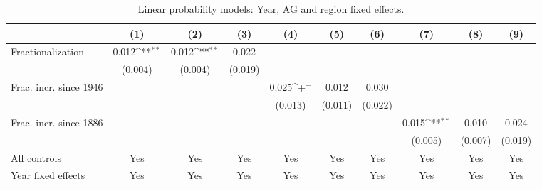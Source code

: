 \begin{table}[htbp]\centering
\def\sym#1{\ifmmode^{#1}\else\(^{#1}\)\fi}
\caption{Linear probability models: Year, AG and region fixed effects. \label{tab:rob:fe2}}
\begin{tabular}{l*{9}{c}}
\hline\hline
                    &\multicolumn{1}{c}{(1)}         &\multicolumn{1}{c}{(2)}         &\multicolumn{1}{c}{(3)}         &\multicolumn{1}{c}{(4)}         &\multicolumn{1}{c}{(5)}         &\multicolumn{1}{c}{(6)}         &\multicolumn{1}{c}{(7)}         &\multicolumn{1}{c}{(8)}         &\multicolumn{1}{c}{(9)}         \\
\hline
Fractionalization   &       0.012\sym{**} &       0.012\sym{**} &       0.022         &                     &                     &                     &                     &                     &                     \\
                    &     (0.004)         &     (0.004)         &     (0.019)         &                     &                     &                     &                     &                     &                     \\
Frac. incr. since 1946&                     &                     &                     &       0.025\sym{+}  &       0.012         &       0.030         &                     &                     &                     \\
                    &                     &                     &                     &     (0.013)         &     (0.011)         &     (0.022)         &                     &                     &                     \\
Frac. incr. since 1886&                     &                     &                     &                     &                     &                     &       0.015\sym{**} &       0.010         &       0.024         \\
                    &                     &                     &                     &                     &                     &                     &     (0.005)         &     (0.007)         &     (0.019)         \\
\hline
All controls        &         Yes         &         Yes         &         Yes         &         Yes         &         Yes         &         Yes         &         Yes         &         Yes         &         Yes         \\
Year fixed effects  &         Yes         &         Yes         &         Yes         &         Yes         &         Yes         &         Yes         &         Yes         &         Yes         &         Yes         \\

\end{tabular}
\end{table}
